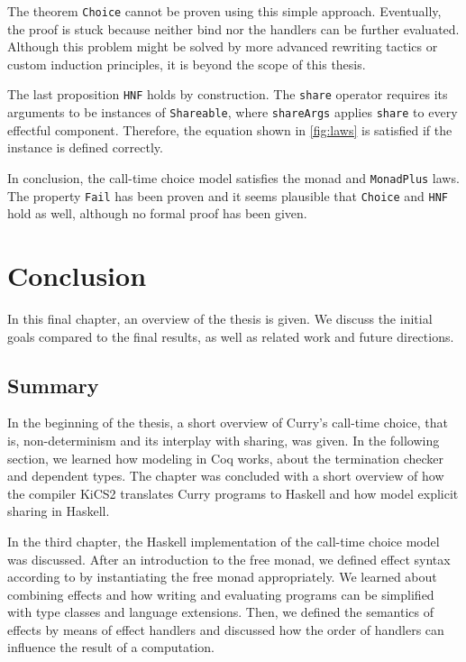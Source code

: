 \documentclass[a4paper, 11pt, fleqn, twoside, abstract=on]{scrreprt}
\newcommand{\hinl}[1]{\texttt{#1}}
\newcommand{\cinl}[1]{\texttt{#1}}
\begin{document}
The theorem \cinl{Choice} cannot be proven using this simple approach.
Eventually, the proof is stuck because neither bind nor the handlers can be further evaluated.
Although this problem might be solved by more advanced rewriting tactics or custom induction principles, it is beyond the scope of this thesis.

The last proposition \cinl{HNF} holds by construction.
The \cinl{share} operator requires its arguments to be instances of \cinl{Shareable}, where \cinl{shareArgs} applies \cinl{share} to every effectful component.
Therefore, the equation shown in \autoref{fig:laws} is satisfied if the instance is defined correctly.

In conclusion, the call-time choice model satisfies the monad and \hinl{MonadPlus} laws.
The property \cinl{Fail} has been proven and it seems plausible that \cinl{Choice} and \cinl{HNF} hold as well, although no formal proof has been given.

\chapter{Conclusion}
\label{ch:conclusion}

In this final chapter, an overview of the thesis is given.
We discuss the initial goals compared to the final results, as well as related work and future directions.

\section{Summary}

In the beginning of the thesis, a short overview of Curry's call-time choice, that is, non-determinism and its interplay with sharing, was given.
In the following section, we learned how modeling in Coq works, about the termination checker and dependent types.
The chapter was concluded with a short overview of how the compiler KiCS2 translates Curry programs to Haskell and how \citet{fischer2009purely} model explicit sharing in Haskell.

In the third chapter, the Haskell implementation of the call-time choice model was discussed.
After an introduction to the free monad, we defined effect syntax according to \citet{wu2014effect} by instantiating the free monad appropriately.
We learned about combining effects and how writing and evaluating programs can be simplified with type classes and language extensions.
Then, we defined the semantics of effects by means of effect handlers and discussed how the order of handlers can influence the result of a computation.
\end{document}
